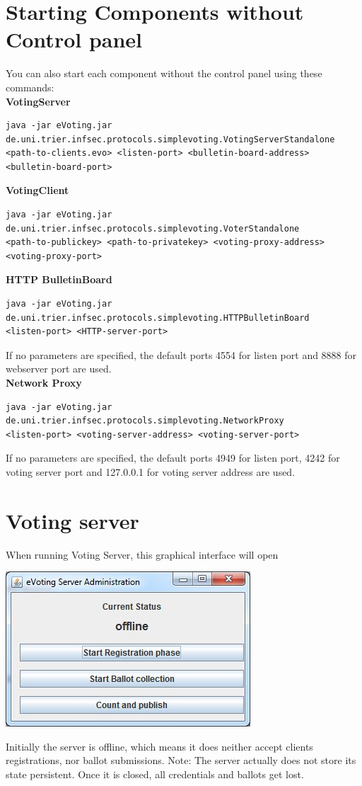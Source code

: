 \documentclass{article}
\begin{document}
\section{Starting Components without Control panel}
You can also start each component without the control panel using these commands:\\
\textbf{VotingServer}
\begin{lstlisting}
java -jar eVoting.jar 
de.uni.trier.infsec.protocols.simplevoting.VotingServerStandalone 
<path-to-clients.evo> <listen-port> <bulletin-board-address> <bulletin-board-port>
\end{lstlisting}
\textbf{VotingClient}
\begin{lstlisting}
java -jar eVoting.jar 
de.uni.trier.infsec.protocols.simplevoting.VoterStandalone
<path-to-publickey> <path-to-privatekey> <voting-proxy-address> <voting-proxy-port>
\end{lstlisting}
\textbf{HTTP BulletinBoard}
\begin{lstlisting}
java -jar eVoting.jar 
de.uni.trier.infsec.protocols.simplevoting.HTTPBulletinBoard 
<listen-port> <HTTP-server-port>
\end{lstlisting}
If no parameters are specified, the default ports 4554 for listen port and 8888 for webserver port are used.\\
\textbf{Network Proxy}
\begin{lstlisting}
java -jar eVoting.jar 
de.uni.trier.infsec.protocols.simplevoting.NetworkProxy
<listen-port> <voting-server-address> <voting-server-port>
\end{lstlisting}
If no parameters are specified, the default ports 4949 for listen port, 4242 for voting server port and 127.0.0.1 for voting server address are used.

\section{Voting server}
When running Voting Server, this graphical interface will open\\
\begin{center}\includegraphics{./server.jpg}\end{center}
Initially the server is offline, which means it does neither accept clients registrations, nor ballot submissions. Note: The server actually does not store its state persistent. Once it is closed, all credentials and ballots get lost.
\end{document}
